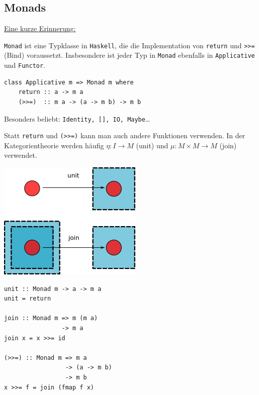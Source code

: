 \documentclass{beamer}
\begin{document}
\subsection*{Monads}

\begin{frame}[fragile]

\underline{Eine kurze Erinnerung:}\bigskip

\texttt{Monad} ist eine Typklasse in \texttt{Haskell}, die die Implementation von \texttt{return} und \texttt{>>=} (Bind) voraussetzt. Insbesondere ist jeder Typ in \texttt{Monad} ebenfalls in \texttt{Applicative} und \texttt{Functor}.\bigskip

\begin{verbatim}
class Applicative m => Monad m where
    return :: a -> m a
    (>>=)  :: m a -> (a -> m b) -> m b
\end{verbatim}
\pause

Besonders beliebt: \texttt{Identity, [], IO, Maybe}\dots
\end{frame}


\begin{frame}[fragile]

Statt \texttt{return} und \texttt{(>>=)} kann man auch andere Funktionen verwenden.
In der Kategorientheorie werden häufig $\eta : I \to M$ (unit) und $\mu : M \times M \to M$ (join) verwendet.
\pause

\begin{multicols}{2}

\begin{center}
\includegraphics[scale=0.4]{Unit-join.png} 
\end{center}

\columnbreak
\pause

\begin{verbatim}
unit :: Monad m -> a -> m a
unit = return

join :: Monad m => m (m a)
                -> m a
join x = x >>= id

(>>=) :: Monad m => m a
                 -> (a -> m b)
                 -> m b
x >>= f = join (fmap f x)
\end{verbatim}

\end{multicols}


\end{frame}
\end{document}

